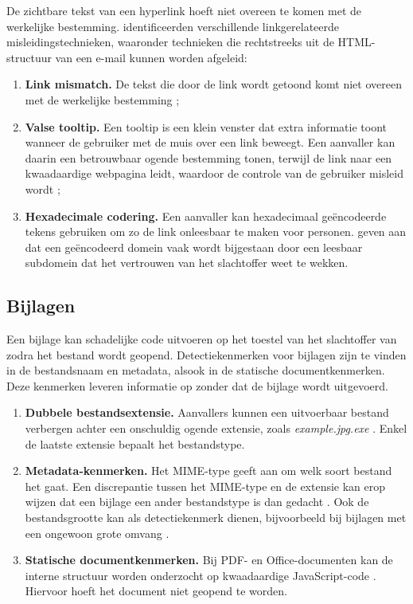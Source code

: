 De zichtbare tekst van een hyperlink hoeft niet overeen te komen met de werkelijke bestemming. \textcite{Veit2025} identificeerden verschillende linkgerelateerde misleidingstechnieken, waaronder technieken die rechtstreeks uit de HTML-structuur van een e-mail kunnen worden afgeleid:

\begin{enumerate}
    \item \textbf{Link mismatch.} De tekst die door de link wordt getoond komt niet overeen met de werkelijke bestemming \autocite{Fette2007,Veit2025};
    \item \textbf{Valse tooltip.} Een tooltip is een klein venster dat extra informatie toont wanneer de gebruiker met de muis over een link beweegt. Een aanvaller kan daarin een betrouwbaar ogende bestemming tonen, terwijl de link naar een kwaadaardige webpagina leidt, waardoor de controle van de gebruiker misleid wordt \autocite{Veit2025};
    \item \textbf{Hexadecimale codering.} Een aanvaller kan hexadecimaal geëncodeerde tekens gebruiken om zo de link onleesbaar te maken voor personen. \textcite{Veit2025} geven aan dat een geëncodeerd domein vaak wordt bijgestaan door een leesbaar subdomein dat het vertrouwen van het slachtoffer weet te wekken.
\end{enumerate}

\subsection{Bijlagen}%
\label{subsec:bijlagen}

Een bijlage kan schadelijke code uitvoeren op het toestel van het slachtoffer van zodra het bestand wordt geopend.
Detectiekenmerken voor bijlagen zijn te vinden in de bestandsnaam en metadata, alsook in de statische documentkenmerken. Deze kenmerken leveren informatie op zonder dat de bijlage wordt uitgevoerd.

\begin{enumerate}
    \item \textbf{Dubbele bestandsextensie.} Aanvallers kunnen een uitvoerbaar bestand verbergen achter een onschuldig ogende extensie, zoals \emph{example.jpg.exe} \autocite{Alazab2016}. Enkel de laatste extensie bepaalt het bestandstype.
    \item \textbf{Metadata-kenmerken.} Het MIME-type geeft aan om welk soort bestand het gaat. Een discrepantie tussen het MIME-type en de extensie kan erop wijzen dat een bijlage een ander bestandstype is dan gedacht \autocite{Mendes2025}. Ook de bestandsgrootte kan als detectiekenmerk dienen, bijvoorbeeld bij bijlagen met een ongewoon grote omvang \autocite{Mendes2025}.
    \item \textbf{Statische documentkenmerken.} Bij PDF- en Office-documenten kan de interne structuur worden onderzocht op kwaadaardige JavaScript-code \autocite{Srndic2013}. Hiervoor hoeft het document niet geopend te worden.
\end{enumerate}

